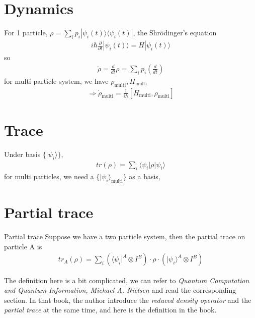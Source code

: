 \documentclass[UTF8,12pt]{article} %
\begin{document}
\section{Dynamics}

For 1 particle, $\rho = \sum_{i} p_{i} |\psi_{i}(t)\rangle\langle\psi_{i}(t)|$, the Shr\"{o}dinger's equation
\begin{align}
i\hbar\frac{\partial}{\partial t}|\psi_{i}(t)\rangle = H|\psi_{i}(t)\rangle
\end{align}
so
\begin{align}
\dot{\rho} = \frac{d}{dt} \rho = \sum_{i} p_{i}\left(\frac{d}{dt}\right)
\end{align}
for multi particle system, we have $\rho_{\text{multi}}, H_{\text{multi}}$
\begin{align}
\Rightarrow \dot{\rho}_{\text{multi}} = \frac{1}{i\hbar}[H_{\text{multi}},\rho_{\text{multi}}]
\end{align}

\section{Trace}

Under basis $\{|\psi_{i}\rangle\}$,
\begin{align}
tr(\rho) = \sum_{i}\langle\psi_{i}|\rho|\psi_{i}\rangle
\end{align}
for multi particles, we need a $\{|\psi_{i}\rangle_{\text{multi}}\}$ as a basis,

\section{Partial trace}

\begin{definition}{Partial trace}{}
Suppose we have a two particle system, then the partial trace on particle A is
\begin{align}
tr_{A}(\rho) = \sum_{i} \left(\langle\psi_{i}|^{A} \otimes I^{B}\right) \cdot \rho \cdot \left(|\psi_{i}\rangle^{A} \otimes I^{B}\right)
\end{align}
\end{definition}

The definition here is a bit complicated, we can refer to \textit{Quantum Computation and Quantum Information, Michael A. Nielsen} and read the corresponding section. In that book, the author introduce the \textit{reduced density operator} and the \textit{partial trace} at the same time, and here is the definition in the book.\\
\end{document}
